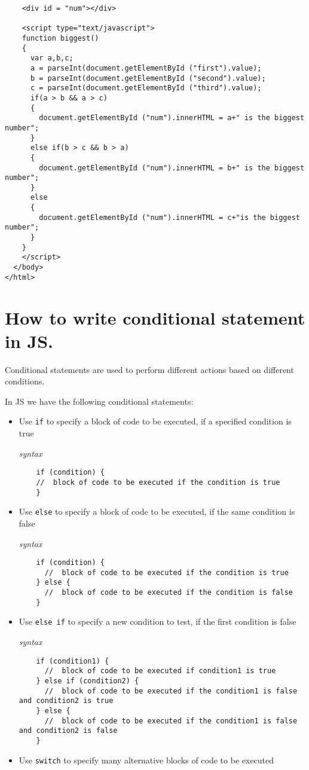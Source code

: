 \documentclass[14pt]{article}
\begin{document}
{\begin{lstlisting}
    <div id = "num"></div>
  
    <script type="text/javascript">
    function biggest()
    {
      var a,b,c;
      a = parseInt(document.getElementById ("first").value);
      b = parseInt(document.getElementById ("second").value);
      c = parseInt(document.getElementById ("third").value);
      if(a > b && a > c)
      {
        document.getElementById ("num").innerHTML = a+" is the biggest number";
      }
      else if(b > c && b > a)
      {
        document.getElementById ("num").innerHTML = b+" is the biggest number";
      }
      else
      {
        document.getElementById ("num").innerHTML = c+"is the biggest number";
      }
    }
    </script>
  </body>
</html>
\end{lstlisting}
\section{How to write conditional statement in JS.}
Conditional statements are used to perform different actions based on different conditions.

In JS we have the following conditional statements:
\begin{itemize}
  \item Use \texttt{if} to specify a block of code to be executed, if a specified condition is true
    
    \textit{syntax}
    \begin{lstlisting}
    if (condition) {
    //  block of code to be executed if the condition is true
    }
    \end{lstlisting}
  \item Use \texttt{else} to specify a block of code to be executed, if the same condition is false
    
    \textit{syntax}
    \begin{lstlisting}
    if (condition) {
      //  block of code to be executed if the condition is true
    } else {
      //  block of code to be executed if the condition is false
    }
    \end{lstlisting}
  \item Use \texttt{else if} to specify a new condition to test, if the first condition is false
    
    \textit{syntax}
    \begin{lstlisting}
    if (condition1) {
      //  block of code to be executed if condition1 is true
    } else if (condition2) {
      //  block of code to be executed if the condition1 is false and condition2 is true
    } else {
      //  block of code to be executed if the condition1 is false and condition2 is false
    }
    \end{lstlisting}
  \item Use \texttt{switch} to specify many alternative blocks of code to be executed
    

\end{itemize}}
\end{document}
